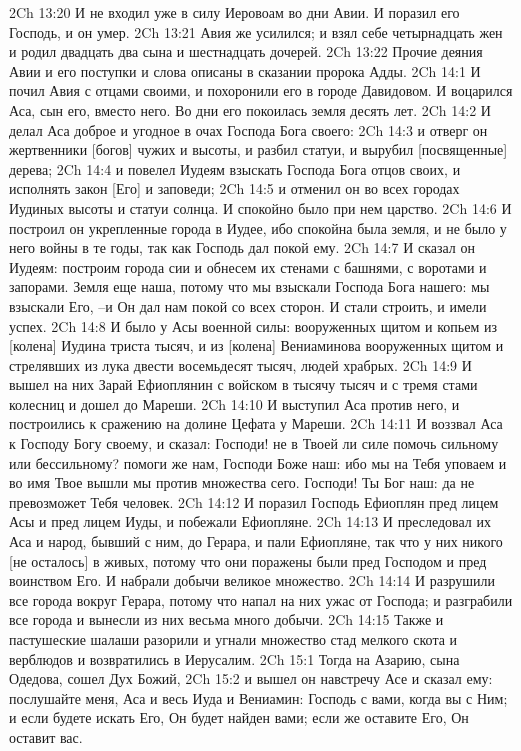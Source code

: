 2Ch 13:20  И не входил уже в силу Иеровоам во дни Авии. И поразил его Господь, и он умер.
2Ch 13:21  Авия же усилился; и взял себе четырнадцать жен и родил двадцать два сына и шестнадцать дочерей.
2Ch 13:22  Прочие деяния Авии и его поступки и слова описаны в сказании пророка Адды.
2Ch 14:1  И почил Авия с отцами своими, и похоронили его в городе Давидовом. И воцарился Аса, сын его, вместо него. Во дни его покоилась земля десять лет.
2Ch 14:2  И делал Аса доброе и угодное в очах Господа Бога своего:
2Ch 14:3  и отверг он жертвенники [богов] чужих и высоты, и разбил статуи, и вырубил [посвященные] дерева;
2Ch 14:4  и повелел Иудеям взыскать Господа Бога отцов своих, и исполнять закон [Его] и заповеди;
2Ch 14:5  и отменил он во всех городах Иудиных высоты и статуи солнца. И спокойно было при нем царство.
2Ch 14:6  И построил он укрепленные города в Иудее, ибо спокойна была земля, и не было у него войны в те годы, так как Господь дал покой ему.
2Ch 14:7  И сказал он Иудеям: построим города сии и обнесем их стенами с башнями, с воротами и запорами. Земля еще наша, потому что мы взыскали Господа Бога нашего: мы взыскали Его, --и Он дал нам покой со всех сторон. И стали строить, и имели успех.
2Ch 14:8  И было у Асы военной силы: вооруженных щитом и копьем из [колена] Иудина триста тысяч, и из [колена] Вениаминова вооруженных щитом и стрелявших из лука двести восемьдесят тысяч, людей храбрых.
2Ch 14:9  И вышел на них Зарай Ефиоплянин с войском в тысячу тысяч и с тремя стами колесниц и дошел до Мареши.
2Ch 14:10  И выступил Аса против него, и построились к сражению на долине Цефата у Мареши.
2Ch 14:11  И воззвал Аса к Господу Богу своему, и сказал: Господи! не в Твоей ли силе помочь сильному или бессильному? помоги же нам, Господи Боже наш: ибо мы на Тебя уповаем и во имя Твое вышли мы против множества сего. Господи! Ты Бог наш: да не превозможет Тебя человек.
2Ch 14:12  И поразил Господь Ефиоплян пред лицем Асы и пред лицем Иуды, и побежали Ефиопляне.
2Ch 14:13  И преследовал их Аса и народ, бывший с ним, до Герара, и пали Ефиопляне, так что у них никого [не осталось] в живых, потому что они поражены были пред Господом и пред воинством Его. И набрали добычи великое множество.
2Ch 14:14  И разрушили все города вокруг Герара, потому что напал на них ужас от Господа; и разграбили все города и вынесли из них весьма много добычи.
2Ch 14:15  Также и пастушеские шалаши разорили и угнали множество стад мелкого скота и верблюдов и возвратились в Иерусалим.
2Ch 15:1  Тогда на Азарию, сына Одедова, сошел Дух Божий,
2Ch 15:2  и вышел он навстречу Асе и сказал ему: послушайте меня, Аса и весь Иуда и Вениамин: Господь с вами, когда вы с Ним; и если будете искать Его, Он будет найден вами; если же оставите Его, Он оставит вас.

